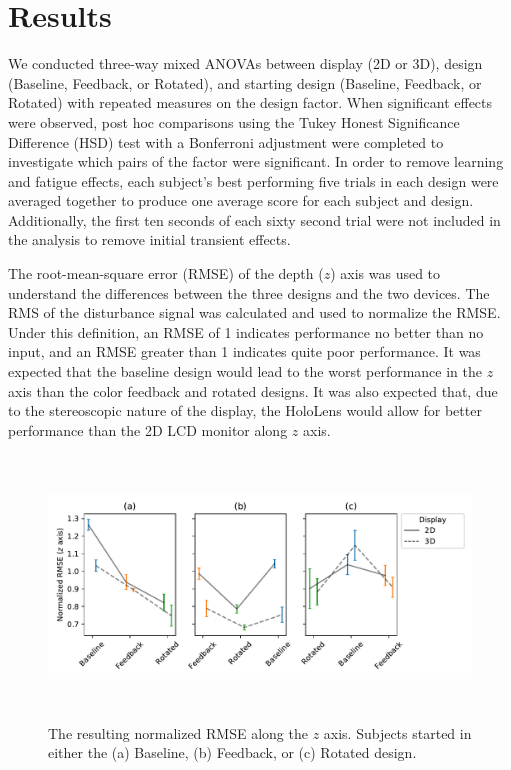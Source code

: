 \section{Results}
We conducted three-way mixed ANOVAs between display (2D or 3D), design (Baseline, Feedback, or Rotated), and starting design (Baseline, Feedback, or Rotated) with repeated measures on the design factor.
When significant effects were observed, post hoc comparisons using the Tukey Honest Significance Difference (HSD) test with a Bonferroni adjustment were completed to investigate which pairs of the factor were significant.
In order to remove learning and fatigue effects, each subject's best performing five trials in each design were averaged together to produce one average score for each subject and design.
Additionally, the first ten seconds of each sixty second trial were not included in the analysis to remove initial transient effects.

The root-mean-square error (RMSE) of the depth ($z$) axis was used to understand the differences between the three designs and the two devices.
The RMS of the disturbance signal was calculated and used to normalize the RMSE.
Under this definition, an RMSE of 1 indicates performance no better than no input, and an RMSE greater than 1 indicates quite poor performance.
It was expected that the baseline design would lead to the worst performance in the $z$ axis than the color feedback and rotated designs.
It was also expected that, due to the stereoscopic nature of the display, the HoloLens would allow for better performance than the 2D LCD monitor along $z$ axis.

\begin{figure}[tb!]
    \begin{center}
        \includegraphics[height=7cm]{plots/x_design_y_zrmse_col_startdesign_hue_device.png}
        \caption{The resulting normalized RMSE along the $z$ axis. Subjects started in either the (a) Baseline, (b) Feedback, or (c) Rotated design.}
        \label{fig:zrmseanovas}
    \end{center}
\end{figure}

